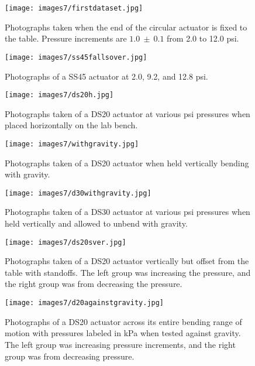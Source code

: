 \begin{figure}[!ht]
    \centering
     \texttt{[image: images7/firstdataset.jpg]}
    \caption{Photographs taken when the end of the circular actuator is fixed to the table. Pressure increments are $1.0~\pm~0.1$ from 2.0 to 12.0 psi.}
    \label{fig:firstdataset}
\end{figure}

\begin{figure}[!ht]
    \centering
     \texttt{[image: images7/ss45fallsover.jpg]}
    \caption{Photographs of a SS45 actuator at 2.0, 9.2, and 12.8 psi.}
    \label{fig:ss45fallsover}
\end{figure}


\begin{figure}[!ht]
    \centering
     \texttt{[image: images7/ds20h.jpg]}
    \caption{Photographs taken of a DS20 actuator at various psi pressures when placed horizontally on the lab bench.}
    \label{fig:ds20h}
\end{figure}

\begin{figure}[!ht]
    \centering
     \texttt{[image: images7/withgravity.jpg]}
    \caption{Photographs taken of a DS20 actuator when held vertically bending with gravity.}
    \label{fig:withgravity}
\end{figure}


\begin{figure}[!ht]
    \centering
     \texttt{[image: images7/d30withgravity.jpg]}
    \caption{Photographs taken of a DS30 actuator at various psi pressures when held vertically and allowed to unbend with gravity.}
    \label{fig:d30withgravity}
\end{figure}



\begin{figure}[!ht]
    \centering
     \texttt{[image: images7/ds20sver.jpg]}
    \caption{Photographs taken of a DS20 actuator vertically but offset from the table with standoffs. The left group was increasing the pressure, and the right group was from decreasing the pressure.}
    \label{fig:ds20sver}
\end{figure}


\begin{figure}[!ht]
    \centering
     \texttt{[image: images7/d20againstgravity.jpg]}
    \caption{Photographs of a DS20 actuator across its entire bending range of motion with pressures labeled in kPa when tested against gravity. The left group was increasing pressure increments, and the right group was from decreasing pressure.}
    \label{fig:d20againstgravity}
\end{figure}

